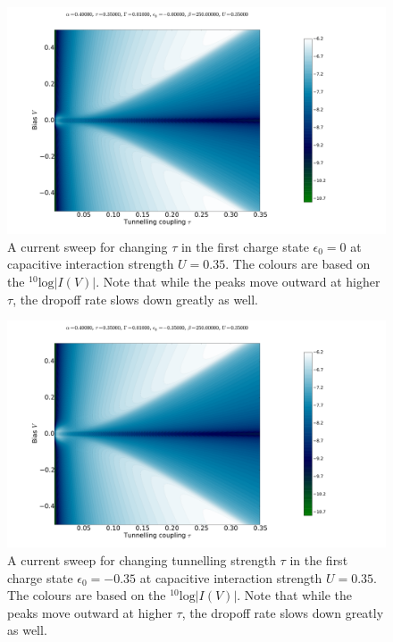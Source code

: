 \begin{figure}[h]
    \centering
     \includegraphics[height=.38\textheight]{pdf/tauscanfirstcharge.pdf}
    \caption{A current sweep for changing $\tau$ in the first charge state $\epsilon_0 = 0$ at capacitive interaction strength $U=0.35$. The colours are based on the $^{10}\text{log}\left|I(V)\right|$. Note that while the peaks move outward at higher $\tau$, the dropoff rate slows down greatly as well.}
    \label{fig:tauscanfirst}
\end{figure}
\begin{figure}[h]
    \centering
     \includegraphics[height=.38\textheight]{pdf/tauscansecondcharge.pdf}
    \caption{A current sweep for changing tunnelling strength $\tau$ in the first charge state $\epsilon_0 = -0.35$ at capacitive interaction strength $U=0.35$. The colours are based on the $^{10}\text{log}\left|I(V)\right|$. Note that while the peaks move outward at higher $\tau$, the dropoff rate slows down greatly as well.}
    \label{fig:tauscansecond}
\end{figure}
 

